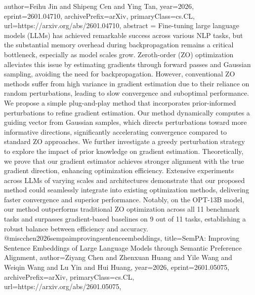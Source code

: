 {      author={Feihu Jin and Shipeng Cen and Ying Tan},
      year={2026},
      eprint={2601.04710},
      archivePrefix={arXiv},
      primaryClass={cs.CL},
      url={https://arxiv.org/abs/2601.04710},
      abstract = {Fine-tuning large language models (LLMs) has achieved remarkable success across various NLP tasks, but the substantial memory overhead during backpropagation remains a critical bottleneck, especially as model scales grow. Zeroth-order (ZO) optimization alleviates this issue by estimating gradients through forward passes and Gaussian sampling, avoiding the need for backpropagation. However, conventional ZO methods suffer from high variance in gradient estimation due to their reliance on random perturbations, leading to slow convergence and suboptimal performance. We propose a simple plug-and-play method that incorporates prior-informed perturbations to refine gradient estimation. Our method dynamically computes a guiding vector from Gaussian samples, which directs perturbations toward more informative directions, significantly accelerating convergence compared to standard ZO approaches. We further investigate a greedy perturbation strategy to explore the impact of prior knowledge on gradient estimation. Theoretically, we prove that our gradient estimator achieves stronger alignment with the true gradient direction, enhancing optimization efficiency. Extensive experiments across LLMs of varying scales and architectures demonstrate that our proposed method could seamlessly integrate into existing optimization methods, delivering faster convergence and superior performance. Notably, on the OPT-13B model, our method outperforms traditional ZO optimization across all 11 benchmark tasks and surpasses gradient-based baselines on 9 out of 11 tasks, establishing a robust balance between efficiency and accuracy.}
}@misc{chen2026sempaimprovingsentenceembeddings,
      title={SemPA: Improving Sentence Embeddings of Large Language Models through Semantic Preference Alignment}, 
      author={Ziyang Chen and Zhenxuan Huang and Yile Wang and Weiqin Wang and Lu Yin and Hui Huang},
      year={2026},
      eprint={2601.05075},
      archivePrefix={arXiv},
      primaryClass={cs.CL},
      url={https://arxiv.org/abs/2601.05075},
}
